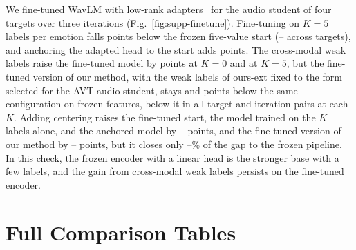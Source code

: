 \documentclass[10pt,journal,compsoc]{IEEEtran}
\begin{document}
We fine-tuned WavLM with low-rank adapters~\cite{hu2022lora} for the audio student of four targets over three iterations (Fig.~\ref{fig:supp-finetune}).
Fine-tuning on $K=5$ labels per emotion falls  points below the frozen five-value start (-- across targets), and anchoring the adapted head to the start adds  points.
The cross-modal weak labels raise the fine-tuned model by  points at $K=0$ and  at $K=5$, but the fine-tuned version of our method, with the weak labels of ours-ext fixed to the form selected for the AVT audio student, stays  and  points below the same configuration on frozen features, below it in all  target and iteration pairs at each $K$.
Adding centering raises the fine-tuned start, the model trained on the $K$ labels alone, and the anchored model by -- points, and the fine-tuned version of our method by -- points, but it closes only --\% of the gap to the frozen pipeline.
In this check, the frozen encoder with a linear head is the stronger base with a few labels, and the gain from cross-modal weak labels persists on the fine-tuned encoder.

\section{Full Comparison Tables}
\label{sec:supp-tables}





\end{document}
